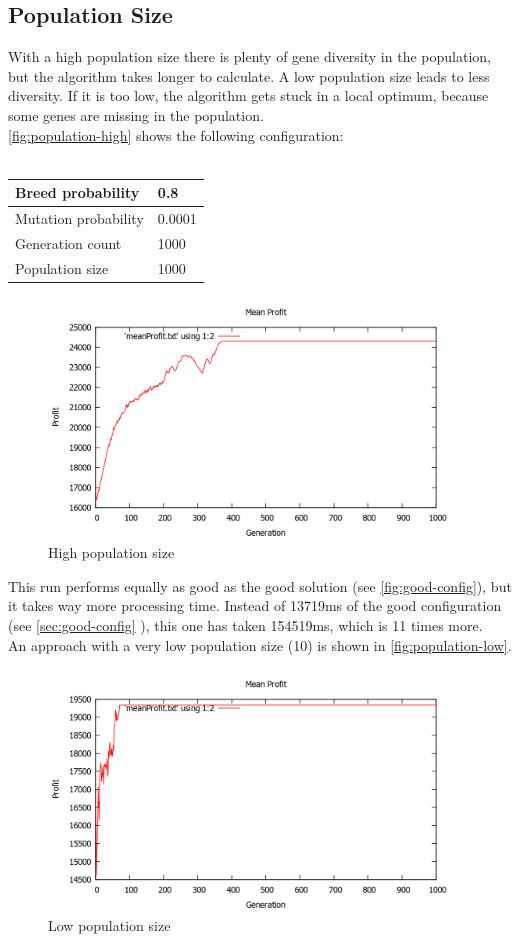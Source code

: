 \documentclass[fontsize=12pt,toc=bibliography, notitlepage]{scrreprt}
\newcommand{\refnn}[1]{\ref{#1} \nameref{#1}}
\begin{document}
\subsection{Population Size}
\label{subsec:population-size}
With a high population size there is plenty of gene diversity in the population, but the algorithm takes longer to calculate. A low population size leads to less diversity. If it is too low, the algorithm gets stuck in a local optimum, because some genes are missing in the population.\\
\autoref{fig:population-high} shows the following configuration: \\ \\
\begin{tabular}{ |l|l| }
	\hline
	Breed probability & 0.8 \\ \hline
	Mutation probability & 0.0001 \\ \hline
	Generation count & 1000 \\ \hline
	Population size & 1000 \\ \hline
\end{tabular}
\begin{figure}[H]
	\centering
	\includegraphics[width=400px]{images/population-high.png}
	\caption{High population size}
	\label{fig:population-high}
\end{figure}
This run performs equally as good as the good solution (see \autoref{fig:good-config}), but it takes way more processing time. Instead of 13719ms of the good configuration (see \refnn{sec:good-config}), this one has taken 154519ms, which is 11 times more.\\
An approach with a very low population size (10) is shown in \autoref{fig:population-low}.
\begin{figure}[H]
	\centering
	\includegraphics[width=400px]{images/population-low.png}
	\caption{Low population size}
	\label{fig:population-low}
\end{figure}
\end{document}
